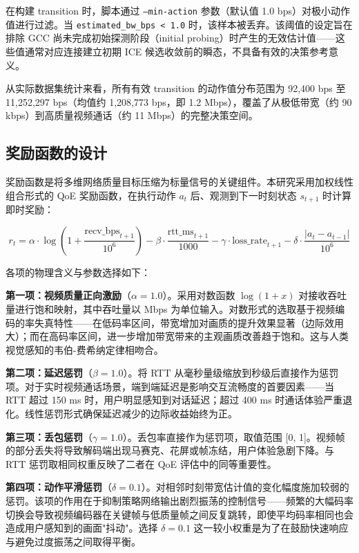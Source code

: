 在构建 transition 时，脚本通过 \texttt{--min-action} 参数（默认值 1.0 bps）对极小动作值进行过滤。当 \texttt{estimated\_bw\_bps < 1.0} 时，该样本被丢弃。该阈值的设定旨在排除 GCC 尚未完成初始探测阶段（initial probing）时产生的无效估计值——这些值通常对应连接建立初期 ICE 候选收敛前的瞬态，不具备有效的决策参考意义。

从实际数据集统计来看，所有有效 transition 的动作值分布范围为 92,400 bps 至 11,252,297 bps（均值约 1,208,773 bps，即 1.2 Mbps），覆盖了从极低带宽（约 90 kbps）到高质量视频通话（约 11 Mbps）的完整决策空间。

\subsection{奖励函数的设计}

奖励函数是将多维网络质量目标压缩为标量信号的关键组件。本研究采用加权线性组合形式的 QoE 奖励函数，在执行动作 $a_t$ 后、观测到下一时刻状态 $s_{t+1}$ 时计算即时奖励：

\[
r_t = \alpha \cdot \log(1 + \frac{\text{recv\_bps}_{t+1}}{10^6}) - \beta \cdot \frac{\text{rtt\_ms}_{t+1}}{1000} - \gamma \cdot \text{loss\_rate}_{t+1} - \delta \cdot \frac{|a_t - a_{t-1}|}{10^6}
\]

各项的物理含义与参数选择如下：

\textbf{第一项：视频质量正向激励}（$\alpha = 1.0$）。采用对数函数 $\log(1 + x)$ 对接收吞吐量进行饱和映射，其中吞吐量以 Mbps 为单位输入。对数形式的选取基于视频编码的率失真特性——在低码率区间，带宽增加对画质的提升效果显著（边际效用大）；而在高码率区间，进一步增加带宽带来的主观画质改善趋于饱和。这与人类视觉感知的韦伯-费希纳定律相吻合。

\textbf{第二项：延迟惩罚}（$\beta = 1.0$）。将 RTT 从毫秒量级缩放到秒级后直接作为惩罚项。对于实时视频通话场景，端到端延迟是影响交互流畅度的首要因素——当 RTT 超过 150 ms 时，用户明显感知到对话延迟；超过 400 ms 时通话体验严重退化。线性惩罚形式确保延迟减少的边际收益始终为正。

\textbf{第三项：丢包惩罚}（$\gamma = 1.0$）。丢包率直接作为惩罚项，取值范围 [0, 1]。视频帧的部分丢失将导致解码端出现马赛克、花屏或帧冻结，用户体验急剧下降。与 RTT 惩罚取相同权重反映了二者在 QoE 评估中的同等重要性。

\textbf{第四项：动作平滑惩罚}（$\delta = 0.1$）。对相邻时刻带宽估计值的变化幅度施加较弱的惩罚。该项的作用在于抑制策略网络输出剧烈振荡的控制信号——频繁的大幅码率切换会导致视频编码器在关键帧与低质量帧之间反复跳转，即使平均码率相同也会造成用户感知到的画面"抖动"。选择 $\delta = 0.1$ 这一较小权重是为了在鼓励快速响应与避免过度振荡之间取得平衡。

